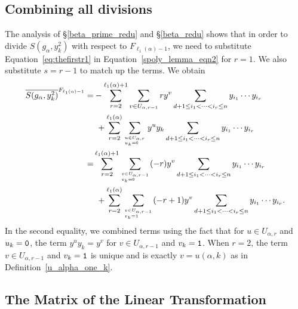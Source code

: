 \documentclass[10pt,a4paper]{article}
\begin{document}
\subsection{\label{final_red}Combining all divisions}
The analysis of \S\ref{beta_prime_redu} and \S\ref{beta_redu} shows that in order to divide $S(g_\alpha, y_k^2)$ with respect to $F_{\ell_1(\alpha)-1}$,  we need to substitute Equation~\eqref{eq:thefirstr1} in Equation~\eqref{spoly_lemma_eqn2} for $r=1$. We also substitute $s=r-1$ to match up the terms. We obtain
\begin{align}
	\overline{S(g_\alpha, y_k^2)}^{F_{\ell_1(\alpha)-1}} = &
	  - \sum_{r=2}^{\ell_1(\alpha)+1} \sum_{v \in U_{\alpha,r-1}} ry^v \sum_{d+1 \leq i_1 < \cdots < i_{r} \leq n}y_{i_1} \cdots  y_{i_{r}} \label{eq:sreduction}\\ 
	  &\  + \sum_{r=2}^{\ell_1(\alpha)}\sum_{u \in U_{\alpha,r}\atop u_k=\textnormal{\texttt{0}} \hfill} y^{u}y_k \sum_{d+1 \leq i_1 < \cdots < i_r \leq n} y_{i_1} \cdots y_{i_{r}}  
	   \notag\\
	   = &
	   \sum_{r=2}^{\ell_1(\alpha)+1} \sum_{v \in U_{\alpha,r-1}\atop v_k=\textnormal{\texttt{0}}\hfill} (-r)y^v \sum_{d+1 \leq i_1 < \cdots < i_{r} \leq n}y_{i_1} \cdots  y_{i_{r}} \label{eq:sreduction2}\\ 
	  &\  + \sum_{r=2}^{\ell_1(\alpha)}\sum_{v \in U_{\alpha,r-1}\atop v_k=1 \hfill} (-r+1)y^{v} \sum_{d+1 \leq i_1 < \cdots < i_r \leq n} y_{i_1} \cdots y_{i_{r}}.
	   \notag
\end{align}
In the second equality, we combined terms using the fact that for $u \in U_{\alpha,r}$ and $u_k=\textnormal{\texttt{0}}$, the term $y^uy_k=y^v$ for $v \in U_{\alpha,r-1}$ and $v_k=\textnormal{\texttt{1}}$. When $r=2$, the term $v \in U_{\alpha,r-1}$ and $v_k=\textnormal{\texttt{1}}$ is unique and is exactly $v=u(\alpha,k)$  as in Definition~\ref{u_alpha_one_k}.

\subsection{\label{results} The Matrix of the Linear Transformation}
\end{document}
